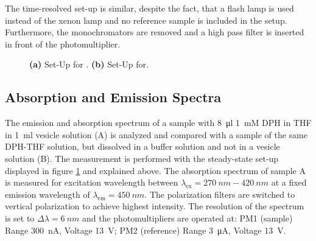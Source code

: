 \documentclass{scrartcl}
\numberwithin{equation}{section}
\numberwithin{figure}{section}
\numberwithin{table}{section}
\begin{document}
The time-resolved set-up is similar, despite the fact, that a flash lamp is used instead of the xenon lamp and no reference sample is included in the setup. Furthermore, the monochromators are removed and a high pass filter is inserted in front of the photomultiplier.

\begin{figure}[h]
\centering
{}
\hfill
{}
\caption{ \small \textbf{(a)} Set-Up for . \textbf{(b)} Set-Up for.}
\label{fig:setup}
\end{figure}

\subsection{Absorption and Emission Spectra}
The emission and absorption spectrum of a sample with \SI{8}{\micro l} \SI{1}{mM} DPH in THF in \SI{1}{ml} vesicle solution (A) is analyzed and compared with a sample of the same DPH-THF solution, but dissolved in a buffer solution and not in a vesicle solution (B). The measurement is performed with the steady-state set-up displayed in figure \ref{fig:setup} and explained above. The absorption spectrum of sample A is measured for excitation wavelength between $\lambda_\text{ex}=\SI{270}{nm} - \SI{420}{nm}$ at a fixed emission wavelength of $\lambda_\text{em}=\SI{450}{nm}$. The polarization filters are switched to vertical polarization to achieve highest intensity. The resolution of the spectrum is set to $\Delta \lambda =\SI{6}{nm}$ and the photomultipliers  are operated at: PM1 (sample) Range \SI{300}{nA}, Voltage \SI{13}{V}; PM2 (reference) Range \SI{3}{\micro A}, Voltage \SI{13}{V}.
\end{document}
